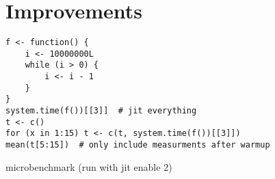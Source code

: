 \chapter{Improvements}

\blind

\begin{listing}[htbp]
  \begin{verbatim}
f <- function() {
    i <- 10000000L
    while (i > 0) {
        i <- i - 1
    }
}
system.time(f())[[3]]  # jit everything
t <- c()
for (x in 1:15) t <- c(t, system.time(f())[[3]])
mean(t[5:15])  # only include measurments after warmup
  \end{verbatim}
  \caption{\label{xxx} microbenchmark (run with jit enable 2)}
\end{listing}

\blind[15]
